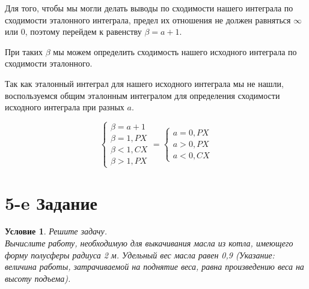 \documentclass[12pt, a4paper]{article}
\newtheorem*{task}{Условие}
\begin{document}
Для того, чтобы мы могли делать выводы по сходимости нашего интеграла по сходимости эталонного интеграла, предел их отношения не должен равняться $\infty$ или $0$, поэтому перейдем к равенству $\beta = a + 1 $. 

При таких $\beta$ мы можем определить сходимость нашего исходного интеграла по сходимости эталонного.

Так как эталонный интеграл для нашего исходного интеграла мы не нашли, воспользуемся общим эталонным интегралом для определения сходимости исходного интеграла при разных $a$.

\begin{equation*}
\begin{cases}
\beta = a + 1\\
\beta = 1, PX\\
\beta < 1, CX\\
\beta > 1, PX
\end{cases} =
\begin{cases}
a = 0, PX\\
a > 0, PX\\
a < 0, CX
\end{cases}
\end{equation*}
\section{5-e Задание}
\begin{task}
Решите задачу.\\
Вычислите работу, необходимую для выкачивания масла из котла, имеющего форму полусферы радиуса 2 м. Удельный вес масла равен 0,9 (Указание: величина работы, затрачиваемой на поднятие веса, равна произведению веса на высоту подъема).
\end{task}
\end{document}
